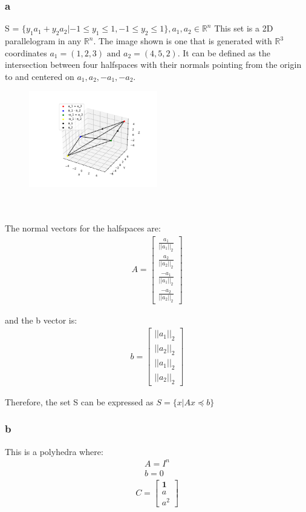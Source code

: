 \subsubsection{a}
S = $\{y_1 a_1 + y_2 a_2 | -1 \leq y_1 \leq 1, -1 \leq y_2 \leq 1 \}, a_1, a_2 \in \mathbb{R}^n$
This set is a 2D parallelogram in any $\mathbb{R}^n$. The image shown is one that is generated with $\mathbb{R}^3$ coordinates $a_1 = (1,2,3) \text{ and } a_2 = (4,5,2)$. It can be defined as the intersection between four halfspaces with their normals pointing from the origin to and centered on $a_1, a_2, -a_1, -a_2$.
\begin{figure}[htbp]
  \centerline{\includegraphics[width=0.5\textwidth]{hw1/images/polyhedra_a.png}}
\end{figure}
\\ \\ 
The normal vectors for the halfspaces are: 
\begin{align}
  A = 
  \begin{bmatrix}
     \frac{a_1}{||a_1||_2} \\
     \frac{a_2}{||a_2||_2} \\ 
     \frac{-a_1}{||a_1||_2} \\
     \frac{-a_2}{||a_2||_2}
  \end{bmatrix}
\end{align}

and the b vector is:
\begin{align}
  b = 
  \begin{bmatrix}
    ||a_1||_2 \\
    ||a_2||_2 \\ 
    ||a_1||_2 \\
    ||a_2||_2
  \end{bmatrix}
\end{align}

Therefore, the set S can be expressed as $S = \{x | Ax \preceq b\}$ 

\subsubsection{b}
This is a polyhedra where:
\begin{gather}
  A = I^n \\
  b = 0
\end{gather}
\begin{align}
  C = 
  \begin{bmatrix}
     \mathbf{1} \\
     a \\
     a^2
  \end{bmatrix}
\end{align}

